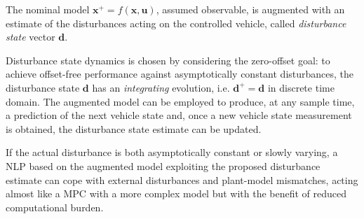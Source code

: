 \documentclass[conference]{IEEEtran} %
\renewcommand{\vec}[1]{\boldsymbol{#1}}
\begin{document}
The nominal model $\vec x^+=f(\vec x, \vec u)$, assumed observable, is augmented with an estimate of the disturbances acting on the controlled vehicle, called \emph{disturbance state} vector $\vec d$.

Disturbance state dynamics is chosen by considering the zero-offset goal: to achieve offset-free performance against asymptotically constant disturbances, the disturbance state $\vec d$ has an \emph{integrating} evolution, i.e. $\vec d^+ = \vec d$ in discrete time domain.
The augmented model can be employed to produce, at any sample time, a prediction of the next vehicle state and, once a new vehicle state measurement is obtained, the disturbance state estimate can be updated.

If the actual disturbance is both asymptotically constant or slowly varying, a NLP based on the augmented model exploiting the proposed disturbance estimate can cope with external disturbances and plant-model mismatches, acting almost like a MPC with a more complex model but with the benefit of reduced computational burden.


\end{document}
